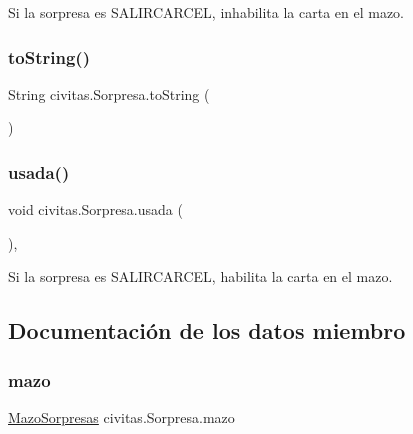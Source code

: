 Si la sorpresa es S\+A\+L\+I\+R\+C\+A\+R\+C\+EL, inhabilita la carta en el mazo. \mbox{\label{classcivitas_1_1Sorpresa_ad2b9c7fd5bcc4ea986fac9ad8c9605e3}} 
\subsubsection{\texorpdfstring{to\+String()}{toString()}}
{\footnotesize\ttfamily String civitas.\+Sorpresa.\+to\+String (\begin{DoxyParamCaption}{ }\end{DoxyParamCaption})\hspace{0.3cm}{\ttfamily [inline]}}

\mbox{\label{classcivitas_1_1Sorpresa_a37c95138a99f3c67b8b93bf921e6baba}} 
\subsubsection{\texorpdfstring{usada()}{usada()}}
{\footnotesize\ttfamily void civitas.\+Sorpresa.\+usada (\begin{DoxyParamCaption}{ }\end{DoxyParamCaption})\hspace{0.3cm}{\ttfamily [inline]}, {\ttfamily [package]}}

Si la sorpresa es S\+A\+L\+I\+R\+C\+A\+R\+C\+EL, habilita la carta en el mazo. 

\subsection{Documentación de los datos miembro}
\mbox{\label{classcivitas_1_1Sorpresa_a3a0aae5184087ccd5a07391a2d5d0e78}} 
\subsubsection{\texorpdfstring{mazo}{mazo}}
{\footnotesize\ttfamily \hyperlink{classcivitas_1_1MazoSorpresas}{Mazo\+Sorpresas} civitas.\+Sorpresa.\+mazo\hspace{0.3cm}{\ttfamily [private]}}

